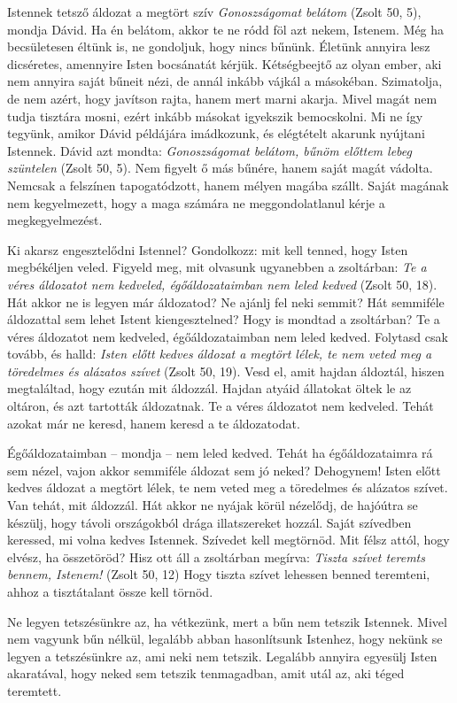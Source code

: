 \documentclass[twoside]{article}
\begin{document}
\begin{lectio}{Istennek tetsző áldozat a megtört szív}
\noindent \textit{Gonoszságomat belátom} (Zsolt 50, 5), mondja Dávid. Ha én belátom, akkor te ne ródd föl azt nekem, Istenem. Még ha becsületesen éltünk is, ne gondoljuk, hogy nincs bűnünk. Életünk annyira lesz dicséretes, amennyire Isten bocsánatát kérjük. Kétségbeejtő az olyan ember, aki nem annyira saját bűneit nézi, de annál inkább vájkál a másokéban. Szimatolja, de nem azért, hogy javítson rajta, hanem mert marni akarja. Mivel magát nem tudja tisztára mosni, ezért inkább másokat igyekszik bemocskolni. Mi ne így tegyünk, amikor Dávid példájára imádkozunk, és elégtételt akarunk nyújtani Istennek. Dávid azt mondta: \textit{Gonoszságomat belátom, bűnöm előttem lebeg szüntelen} (Zsolt 50, 5). Nem figyelt ő más bűnére, hanem saját magát vádolta. Nemcsak a felszínen tapogatódzott, hanem mélyen magába szállt. Saját magának nem kegyelmezett, hogy a maga számára ne meggondolatlanul kérje a megkegyelmezést.

Ki akarsz engesztelődni Istennel? Gondolkozz: mit kell tenned, hogy Isten megbékéljen veled. Figyeld meg, mit olvasunk ugyanebben a zsoltárban: \textit{Te a véres áldozatot nem kedveled, égőáldozataimban nem leled kedved} (Zsolt 50, 18). Hát akkor ne is legyen már áldozatod? Ne ajánlj fel neki semmit? Hát semmiféle áldozattal sem lehet Istent kiengesztelned? Hogy is mondtad a zsoltárban? Te a véres áldozatot nem kedveled, égőáldozataimban nem leled kedved. Folytasd csak tovább, és halld: \textit{Isten előtt kedves áldozat a megtört lélek, te nem veted meg a töredelmes és alázatos szívet} (Zsolt 50, 19). Vesd el, amit hajdan áldoztál, hiszen megtaláltad, hogy ezután mit áldozzál. Hajdan atyáid állatokat öltek le az oltáron, és azt tartották áldozatnak. Te a véres áldozatot nem kedveled. Tehát azokat már ne keresd, hanem keresd a te áldozatodat.

Égőáldozataimban – mondja – nem leled kedved. Tehát ha égőáldozataimra rá sem nézel, vajon akkor semmiféle áldozat sem jó neked? Dehogynem! Isten előtt kedves áldozat a megtört lélek, te nem veted meg a töredelmes és alázatos szívet. Van tehát, mit áldozzál. Hát akkor ne nyájak körül nézelődj, de hajóútra se készülj, hogy távoli országokból drága illatszereket hozzál. Saját szívedben keressed, mi volna kedves Istennek. Szívedet kell megtörnöd. Mit félsz attól, hogy elvész, ha összetöröd? Hisz ott áll a zsoltárban megírva: \textit{Tiszta szívet teremts bennem, Istenem!} (Zsolt 50, 12) Hogy tiszta szívet lehessen benned teremteni, ahhoz a tisztátalant össze kell törnöd.

Ne legyen tetszésünkre az, ha vétkezünk, mert a bűn nem tetszik Istennek. Mivel nem vagyunk bűn nélkül, legalább abban hasonlítsunk Istenhez, hogy nekünk se legyen a tetszésünkre az, ami neki nem tetszik. Legalább annyira egyesülj Isten akaratával, hogy neked sem tetszik tenmagadban, amit utál az, aki téged teremtett.
\end{lectio}
\end{document}
